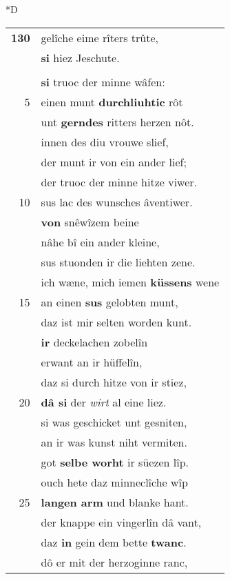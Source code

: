 \documentclass[8pt,a4paper,notitlepage]{article}
\begin{document}
\begin{table}[ht]
\begin{minipage}[t]{0.5\linewidth}
\small
\begin{center}*D
\end{center}
\begin{tabular}{rl}
\textbf{130} & gelîche eime rîters trûte,\\ 
 & \textbf{si} hiez Jeschute.\\ 
 & \textbf{\begin{large}D\end{large}iu vrouwe} was entslâfen.\\ 
 & \textbf{si} truoc der minne wâfen:\\ 
5 & einen munt \textbf{durchliuhtic} rôt\\ 
 & unt \textbf{gerndes} ritters herzen nôt.\\ 
 & innen des diu vrouwe slief,\\ 
 & der munt ir von ein ander lief;\\ 
 & der truoc der minne hitze viwer.\\ 
10 & sus lac des wunsches âventiwer.\\ 
 & \textbf{von} snêwîzem beine\\ 
 & nâhe bî ein ander kleine,\\ 
 & sus stuonden ir die liehten zene.\\ 
 & ich wæne, mich iemen \textbf{küssens} wene\\ 
15 & an einen \textbf{sus} gelobten munt,\\ 
 & daz ist mir selten worden kunt.\\ 
 & \textbf{ir} deckelachen zobelîn\\ 
 & erwant an ir hüffelîn,\\ 
 & daz si durch hitze von ir stiez,\\ 
20 & \textbf{dâ si} der \textit{wirt} al eine liez.\\ 
 & si was geschicket unt gesniten,\\ 
 & an ir was kunst niht vermiten.\\ 
 & got \textbf{selbe worht} ir süezen lîp.\\ 
 & ouch hete daz minneclîche wîp\\ 
25 & \textbf{langen arm} und blanke hant.\\ 
 & der knappe ein vingerlîn dâ vant,\\ 
 & daz \textbf{in} gein dem bette \textbf{twanc}.\\ 
 & dô er mit der herzoginne ranc,\\ 

\end{tabular}
\end{minipage}
\end{table}
\end{document}
